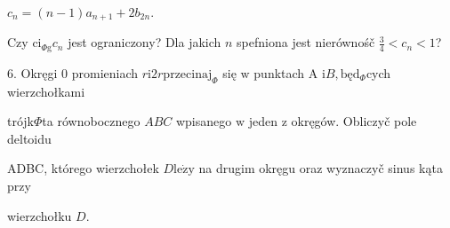 \documentclass[a4paper,12pt]{article}
\begin{document}
$c_{n}=(n-1)a_{n+1}+2b_{2n}.$

Czy $\mathrm{c}\mathrm{i}_{\Phi \mathrm{g}}c_{n}$ jest ograniczony? Dla jakich $n$ spefniona jest nierównośč $\displaystyle \frac{3}{4}<c_{n}<1$?

6. Okręgi $0$ promieniach $r\mathrm{i}2r\mathrm{p}\mathrm{r}\mathrm{z}\mathrm{e}\mathrm{c}\mathrm{i}\mathrm{n}\mathrm{a}\mathrm{j}_{\Phi}$ się $\mathrm{w}$ punktach A $\mathrm{i}B, \mathrm{b}\text{ę} \mathrm{d}_{\Phi}$cych wierzchołkami

trójk$\Phi$ta równobocznego $ABC$ wpisanego $\mathrm{w}$ jeden $\mathrm{z}$ okręgów. Obliczyč pole deltoidu

ADBC, którego wierzchołek $D\mathrm{l}\mathrm{e}\dot{\mathrm{z}}\mathrm{y}$ na drugim okręgu oraz wyznaczyč sinus kąta przy

wierzchołku $D.$
\end{document}
